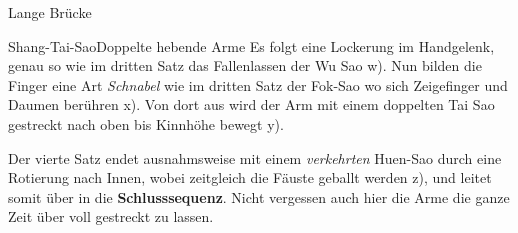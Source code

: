 \begin{WTSatz}{Lange Br\"ucke}
\begin{WTSatzTeil}{Shang-Tai-Sao}{Doppelte hebende Arme}
		Es folgt eine Lockerung im Handgelenk, genau so wie im dritten Satz das Fallenlassen der Wu Sao w). Nun bilden die Finger eine Art \textit{Schnabel} wie im dritten Satz der Fok-Sao wo sich Zeigefinger und Daumen ber\"uhren x). Von dort aus wird der Arm mit einem doppelten Tai Sao gestreckt nach oben bis Kinnh\"ohe bewegt y).
		
		Der vierte Satz endet ausnahmsweise mit einem \textit{verkehrten} Huen-Sao durch eine Rotierung nach Innen, wobei zeitgleich die F\"auste geballt werden z), und leitet somit \"uber in die \textbf{Schlusssequenz}. Nicht vergessen auch hier die Arme die ganze Zeit \"uber voll gestreckt zu lassen.
		
	\end{WTSatzTeil}
\end{WTSatz}




